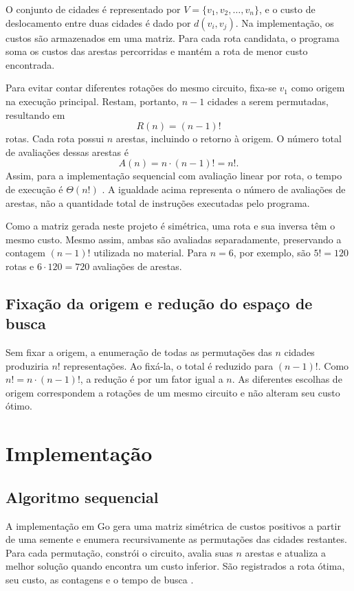 \documentclass[12pt,a4paper]{article}
\begin{document}
O conjunto de cidades é representado por $V=\{v_1,v_2,\ldots,v_n\}$, e o custo de deslocamento entre duas cidades é dado por $d(v_i,v_j)$. Na implementação, os custos são armazenados em uma matriz. Para cada rota candidata, o programa soma os custos das arestas percorridas e mantém a rota de menor custo encontrada.

Para evitar contar diferentes rotações do mesmo circuito, fixa-se $v_1$ como origem na execução principal. Restam, portanto, $n-1$ cidades a serem permutadas, resultando em
\begin{equation}
 R(n)=(n-1)!
\end{equation}
rotas. Cada rota possui $n$ arestas, incluindo o retorno à origem. O número total de avaliações dessas arestas é
\begin{equation}
 A(n)=n\cdot(n-1)!=n!.
\end{equation}
Assim, para a implementação sequencial com avaliação linear por rota, o tempo de execução é $\Theta(n!)$ \cite{material}. A igualdade acima representa o número de avaliações de arestas, não a quantidade total de instruções executadas pelo programa.

Como a matriz gerada neste projeto é simétrica, uma rota e sua inversa têm o mesmo custo. Mesmo assim, ambas são avaliadas separadamente, preservando a contagem $(n-1)!$ utilizada no material. Para $n=6$, por exemplo, são $5!=120$ rotas e $6\cdot120=720$ avaliações de arestas.

\subsection{Fixação da origem e redução do espaço de busca}

Sem fixar a origem, a enumeração de todas as permutações das $n$ cidades produziria $n!$ representações. Ao fixá-la, o total é reduzido para $(n-1)!$. Como $n!=n\cdot(n-1)!$, a redução é por um fator igual a $n$. As diferentes escolhas de origem correspondem a rotações de um mesmo circuito e não alteram seu custo ótimo.

\section{Implementação}

\subsection{Algoritmo sequencial}

A implementação em Go gera uma matriz simétrica de custos positivos a partir de uma semente e enumera recursivamente as permutações das cidades restantes. Para cada permutação, constrói o circuito, avalia suas $n$ arestas e atualiza a melhor solução quando encontra um custo inferior. São registrados a rota ótima, seu custo, as contagens e o tempo de busca \cite{repositorio}.
\end{document}

